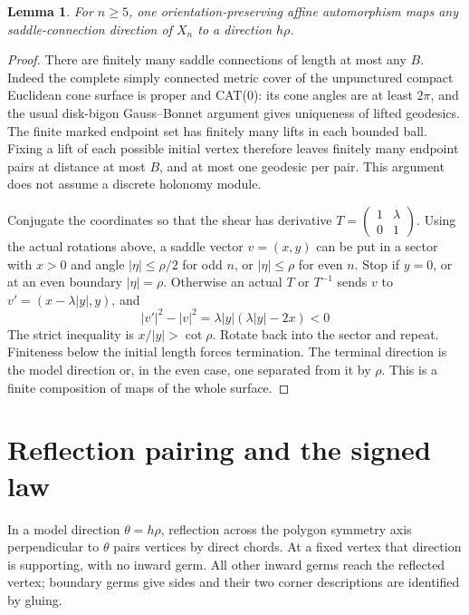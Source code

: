 \documentclass[11pt]{article}
\newtheorem{lemma}[theorem]{Lemma}
\begin{document}
\begin{lemma}\label{reduce}
For $n\ge5$, one orientation-preserving affine automorphism maps
any saddle-connection direction of $X_n$ to a direction $h\rho$.
\end{lemma}
\begin{proof}
There are finitely many saddle connections of length at most any $B$.
Indeed the complete simply connected metric cover of the unpunctured
compact Euclidean cone surface is proper and CAT(0): its cone angles
are at least $2\pi$, and the usual disk-bigon Gauss--Bonnet argument
gives uniqueness of lifted geodesics.
The finite marked endpoint set has finitely many lifts in each bounded
ball. Fixing a lift of each possible initial vertex therefore leaves
finitely many endpoint pairs at distance at most $B$, and at most one
geodesic per pair. This argument does not assume a discrete holonomy
module.

Conjugate the coordinates so that the shear has derivative
$T=\left(\begin{smallmatrix}1&\lambda\\0&1\end{smallmatrix}\right)$.
Using the actual rotations above, a saddle vector $v=(x,y)$ can be
put in a sector with $x>0$ and angle $|\eta|\le\rho/2$ for odd $n$,
or $|\eta|\le\rho$ for even $n$.
Stop if $y=0$, or at an even boundary $|\eta|=\rho$.
Otherwise an actual $T$ or $T^{-1}$ sends $v$ to
$v'=(x-\lambda|y|,y)$, and
\[
|v'|^2-|v|^2
=\lambda|y|(\lambda|y|-2x)<0
\]
The strict inequality is $x/|y|>\cot\rho$.
Rotate back into the sector and repeat. Finiteness below the initial
length forces termination. The terminal direction is the model
direction or, in the even case, one separated from it by $\rho$.
This is a finite composition of maps of the whole surface.
\end{proof}

\section{Reflection pairing and the signed law}
In a model direction $\theta=h\rho$, reflection across the polygon
symmetry axis perpendicular to $\theta$ pairs vertices by direct chords.
At a fixed vertex that direction is supporting, with no inward germ.
All other inward germs reach the reflected vertex; boundary germs
give sides and their two corner descriptions are identified by gluing.
\end{document}
